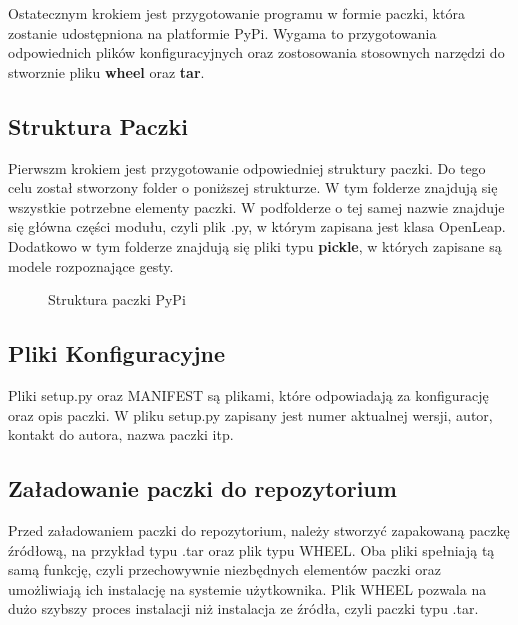 \quad Ostatecznym krokiem jest przygotowanie programu w formie paczki, która zostanie udostępniona na platformie PyPi. Wygama to przygotowania odpowiednich plików konfiguracyjnych oraz zostosowania stosownych narzędzi do stworznie pliku \textbf{wheel} oraz \textbf{tar}. 

\subsection{Struktura Paczki}
\quad Pierwszm krokiem jest przygotowanie odpowiedniej struktury paczki. Do tego celu został stworzony folder o poniższej strukturze. W tym folderze znajdują się wszystkie potrzebne elementy paczki. W podfolderze o tej samej nazwie znajduje się główna części modułu, czyli plik .py, w którym zapisana jest klasa OpenLeap. Dodatkowo w tym folderze znajdują się pliki typu \textbf{pickle}, w których zapisane są modele rozpoznające gesty.

\begin{figure}
\centering
    \begin{minipage}{7cm}
    \end{minipage}
    \caption{Struktura paczki PyPi}
\end{figure}

\subsection{Pliki Konfiguracyjne}
\quad Pliki setup.py oraz MANIFEST są plikami, które odpowiadają za konfigurację oraz opis paczki. W pliku setup.py zapisany jest numer aktualnej wersji, autor, kontakt do autora, nazwa paczki itp. 

\quad 


\subsection{Załadowanie paczki do repozytorium}

\quad Przed załadowaniem paczki do repozytorium, należy stworzyć zapakowaną paczkę źródłową, na przykład typu .tar oraz plik typu WHEEL. Oba pliki spełniają tą samą funkcję, czyli przechowywnie niezbędnych elementów paczki oraz umożliwiają ich instalację na systemie użytkownika. Plik WHEEL pozwala na dużo szybszy proces instalacji niż instalacja ze źródła, czyli paczki typu .tar. 
